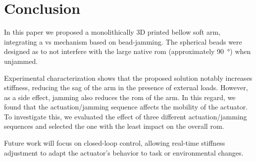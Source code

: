 \section{Conclusion}
\label{sec:conclusions}
In this paper we proposed a monolithically 3D printed bellow soft arm, integrating a \gls{vs} mechanism based on bead-jamming. The spherical beads were designed as to not interfere with the large native \gls{rom} (approximately \SI{90}{\degree}) when unjammed.

Experimental characterization shows that the proposed solution notably increases stiffness, reducing the sag of the arm in the presence of external loads. However, as a side effect, jamming also reduces the \gls{rom} of the arm. In this regard, we found that the actuation/jamming sequence affects the mobility of the actuator. To investigate this, we evaluated the effect of three different actuation/jamming sequences and selected the one with the least impact on the overall \gls{rom}.

Future work will focus on closed-loop control, allowing real-time stiffness adjustment to adapt the actuator’s behavior to task or environmental changes.
